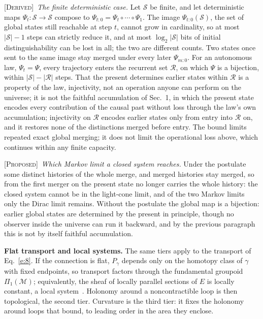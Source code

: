 \documentclass[10pt]{article}
\newcommand{\Derived}{\noindent\textsc{[Derived]}\ }
\newcommand{\Proposed}{\noindent\textsc{[Proposed]}\ }
\begin{document}
\Derived \textit{The finite deterministic case.} Let $\mathcal S$ be finite, and let deterministic maps $\Psi_t:\mathcal S\to\mathcal S$ compose to $\Psi_{t:0}=\Psi_t\circ\cdots\circ\Psi_1$. The image $\Psi_{t:0}(\mathcal S)$, the set of global states still reachable at step $t$, cannot grow in cardinality, so at most $|\mathcal S|-1$ steps can strictly reduce it, and at most $\log_2|\mathcal S|$ bits of initial distinguishability can be lost in all; the two are different counts. Two states once sent to the same image stay merged under every later $\Psi_{m:0}$. For an autonomous law, $\Psi_t=\Psi$, every trajectory enters the recurrent set $\mathcal R$, on which $\Psi$ is a bijection, within $|\mathcal S|-|\mathcal R|$ steps. That the present determines earlier states within $\mathcal R$ is a property of the law, injectivity, not an operation anyone can perform on the universe; it is not the faithful accumulation of Sec.~1, in which the present state encodes every contribution of the causal past without loss through the law's own accumulation; injectivity on $\mathcal R$ encodes earlier states only from entry into $\mathcal R$ on, and it restores none of the distinctions merged before entry. The bound limits repeated exact global merging; it does not limit the operational loss above, which continues within any finite capacity.

\Proposed \textit{Which Markov limit a closed system reaches.} Under the postulate some distinct histories of the whole merge, and merged histories stay merged, so from the first merger on the present state no longer carries the whole history: the closed system cannot be in the light-cone limit, and of the two Markov limits only the Dirac limit remains. Without the postulate the global map is a bijection: earlier global states are determined by the present in principle, though no observer inside the universe can run it backward, and by the previous paragraph this is not by itself faithful accumulation.

\smallskip
\noindent\textbf{Flat transport and local systems.} The same tiers apply to the transport of Eq.~\eqref{e:8}. If the connection is flat, $P_\gamma$ depends only on the homotopy class of $\gamma$ with fixed endpoints, so transport factors through the fundamental groupoid $\Pi_1(\mathcal M)$; equivalently, the sheaf of locally parallel sections of $E$ is locally constant, a local system~\cite{botttu}. Holonomy around a noncontractible loop is then topological, the second tier. Curvature is the third tier: it fixes the holonomy around loops that bound, to leading order in the area they enclose.
\end{document}
